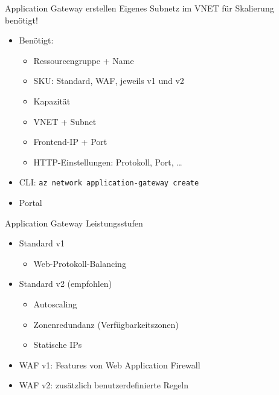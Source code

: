 \begin{flashcard}[Definition]{Application Gateway erstellen}
    Eigenes Subnetz im VNET für Skalierung benötigt!
    \begin{itemize}
        \item Benötigt:
            \begin{itemize}
                \item Ressourcengruppe + Name
                \item SKU: Standard, WAF, jeweils v1 und v2
                \item Kapazität
                \item VNET + Subnet
                \item Frontend-IP + Port
                \item HTTP-Einstellungen: Protokoll, Port, \ldots
            \end{itemize}
        \item CLI: \texttt{az network application-gateway create}
        \item Portal
    \end{itemize}
\end{flashcard}

\begin{flashcard}[Definition]{Application Gateway Leistungsstufen}
    \begin{itemize}
        \item Standard v1
            \begin{itemize}
             \item Web-Protokoll-Balancing
            \end{itemize}
        \item Standard v2 (empfohlen)
            \begin{itemize}
                \item Autoscaling
                \item Zonenredundanz (Verfügbarkeitszonen)
                \item Statische IPs
            \end{itemize}
        \item WAF v1: Features von Web Application Firewall
        \item WAF v2: zusätzlich benutzerdefinierte Regeln
    \end{itemize}
\end{flashcard}

